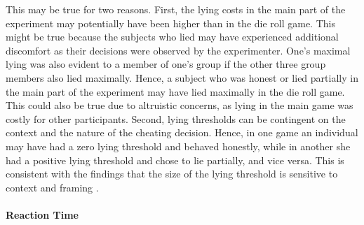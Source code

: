 \documentclass[12pt]{article}
\begin{document}
\par This may be true for two reasons. First, the lying costs in the main part of the experiment may potentially have been higher than in the die roll game. This might be true because the subjects who lied may have experienced additional discomfort as their decisions were observed by the experimenter.\footnotemark{}
One's maximal lying was also evident to a member of one's group if the other three group members also lied maximally. Hence, a subject who was honest or lied partially in the main part of the experiment may have lied maximally in the die roll game. This could also be true due to altruistic concerns, as lying in the main game was costly for other participants.\footnotemark{} Second, lying thresholds can be contingent on the context and the nature of the cheating decision. Hence, in one game an individual may have had a zero lying threshold and behaved honestly, while in another she had a positive lying threshold and chose to lie partially, and vice versa. This is consistent with the findings that the size of the lying threshold is sensitive to context and framing \citep{Mazaretal2008,GinoAriely2016}.





\paragraph{Reaction Time} 

 
\end{document}
